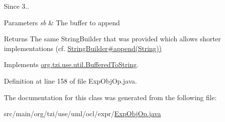 \begin{DoxySince}{Since}
3.. 
\end{DoxySince}

\begin{DoxyParams}{Parameters}
{\em sb} & The buffer to append \\
\hline
\end{DoxyParams}
\begin{DoxyReturn}{Returns}
The same String\-Builder that was provided which allows shorter implementations (cf. \hyperlink{}{String\-Builder\#append(\-String))} 
\end{DoxyReturn}


Implements \hyperlink{interfaceorg_1_1tzi_1_1use_1_1util_1_1_buffered_to_string_aea95e4e53b18818d50ee253700e6e2d5}{org.\-tzi.\-use.\-util.\-Buffered\-To\-String}.



Definition at line 158 of file Exp\-Obj\-Op.\-java.



The documentation for this class was generated from the following file\-:\begin{DoxyCompactItemize}
\item 
src/main/org/tzi/use/uml/ocl/expr/\hyperlink{_exp_obj_op_8java}{Exp\-Obj\-Op.\-java}\end{DoxyCompactItemize}

